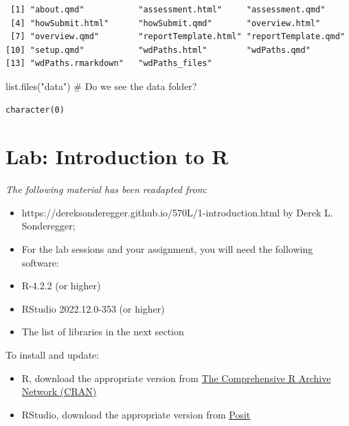 \documentclass[
  letterpaper,
  DIV=11,
  numbers=noendperiod]{scrreprt}
\newenvironment{Shaded}{\begin{snugshade}}{\end{snugshade}}
\newcommand{\CommentTok}[1]{\textcolor[rgb]{0.37,0.37,0.37}{#1}}
\newcommand{\FunctionTok}[1]{\textcolor[rgb]{0.28,0.35,0.67}{#1}}
\newcommand{\NormalTok}[1]{\textcolor[rgb]{0.00,0.23,0.31}{#1}}
\newcommand{\StringTok}[1]{\textcolor[rgb]{0.13,0.47,0.30}{#1}}
\providecommand{\tightlist}{%
  \setlength{\itemsep}{0pt}\setlength{\parskip}{0pt}}\usepackage{longtable,booktabs,array}
\begin{document}
\begin{verbatim}
 [1] "about.qmd"           "assessment.html"     "assessment.qmd"     
 [4] "howSubmit.html"      "howSubmit.qmd"       "overview.html"      
 [7] "overview.qmd"        "reportTemplate.html" "reportTemplate.qmd" 
[10] "setup.qmd"           "wdPaths.html"        "wdPaths.qmd"        
[13] "wdPaths.rmarkdown"   "wdPaths_files"      
\end{verbatim}

\begin{Shaded}
\begin{Highlighting}[]
\FunctionTok{list.files}\NormalTok{(}\StringTok{"data"}\NormalTok{)  }\CommentTok{\# Do we see the data folder?}
\end{Highlighting}
\end{Shaded}

\begin{verbatim}
character(0)
\end{verbatim}


\chapter{Lab: Introduction to R}\label{lab-introduction-to-r}

\emph{The following material has been readapted from}:

\begin{itemize}
\item
  https://dereksonderegger.github.io/570L/1-introduction.html by Derek
  L. Sonderegger;
\item
  For the lab sessions and your assignment, you will need the following
  software:
\item
  R-4.2.2 (or higher)
\item
  RStudio 2022.12.0-353 (or higher)
\item
  The list of libraries in the next section
\end{itemize}

To install and update:

\begin{itemize}
\tightlist
\item
  R, download the appropriate version from
  \href{https://cran.r-project.org/}{The Comprehensive R Archive Network
  (CRAN)}
\item
  RStudio, download the appropriate version from
  \href{https://posit.co/download/rstudio-desktop/}{Posit}
\end{itemize}
\end{document}
